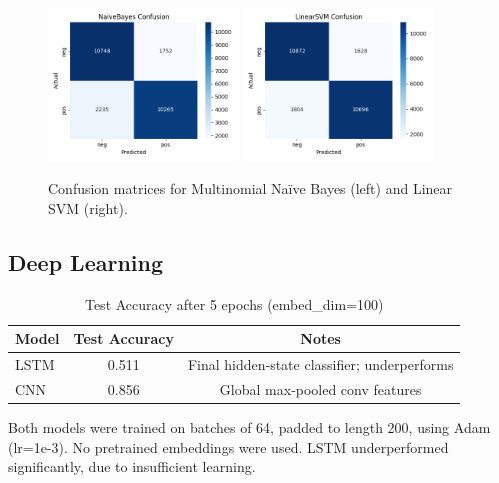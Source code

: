 \documentclass[12pt,a4paper]{article}
\begin{document}
\begin{figure}[H]
  \centering
  \includegraphics[width=0.45\textwidth]{figures/NaiveBayes_confusion.png}
  \includegraphics[width=0.45\textwidth]{figures/LinearSVM_confusion.png}
  \caption{Confusion matrices for Multinomial Naïve Bayes (left) and Linear SVM (right).}
  \label{fig:confusion_matrix_nb_svm}
\end{figure}

\subsection{Deep Learning}

\begin{table}[H]
  \centering
  \caption{Test Accuracy after 5 epochs (embed\_dim=100)}
  \label{tab:dl-results}
  \begin{tabular}{lcc}
    \toprule
    \textbf{Model} & \textbf{Test Accuracy} & \textbf{Notes} \\
    \midrule
    LSTM   & 0.511 & Final hidden‐state classifier; underperforms \\
    CNN    & 0.856 & Global max‐pooled conv features \\
    \bottomrule
  \end{tabular}
\end{table}

\noindent
Both models were trained on batches of 64, padded to length 200, using Adam (lr=1e-3). No pretrained embeddings were used. LSTM underperformed significantly, due to insufficient learning.
\end{document}
